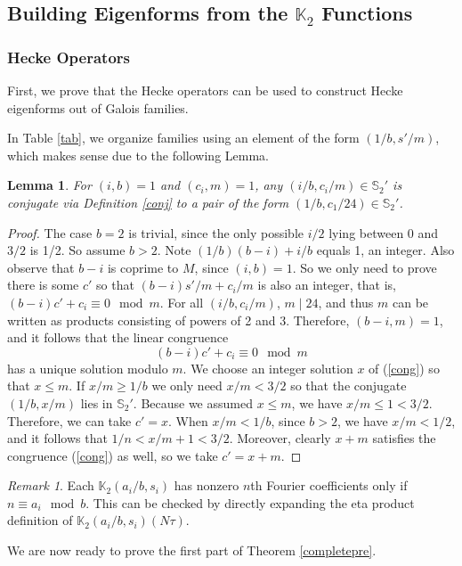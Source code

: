 \documentclass[12pt]{amsart}
\newtheorem{Lemma}[theorem]{Lemma}
\theoremstyle{definition}
\theoremstyle{remark}
\newtheorem{remark}{Remark}
\begin{document}
\subsection{Building Eigenforms from the $\mathbb{K}_2$ Functions}\label{building}
\subsubsection{Hecke Operators}
First, we prove that the Hecke operators can be used to construct Hecke eigenforms out of Galois families.  

In Table \ref{tab}, we organize families using an element of the form $(1/b,s'/m)$, which makes sense due to the following Lemma.
\begin{Lemma}\label{1/b}
   For $(i,b)=1$ and $(c_i,m)=1$, any $(i/b,c_i/m)\in \mathbb S_2'$ is conjugate via Definition \ref{conj} to a pair of the form $(1/b,c_1/24)\in \mathbb S_2'$.
\end{Lemma}
\begin{proof}
    The case $b=2$ is trivial, since the only possible $i/2$ lying between $0$ and $3/2$ is 1/2. So assume $b>2$. Note $(1/b)(b-i)+i/b$ equals 1, an integer. Also observe that $b-i$ is coprime to $M$, since $(i,b)=1$. So we only need to prove there is some $c'$ so that $(b-i)s'/m+c_i/m$ is also an integer, that is, $(b-i)c'+c_i\equiv 0\mod m$. For all $(i/b,c_i/m)$, $m\mid 24$, and thus $m$ can be written as products consisting of powers of 2 and 3. Therefore, $(b-i, m)=1$, and it follows that the linear congruence \begin{equation}\label{cong}
        (b-i)c'+c_i\equiv 0\mod m
    \end{equation} has a unique solution modulo $m$. We choose an integer solution $x$ of (\ref{cong}) so that $x\leq m$. If $x/m\geq 1/b$ we only need $x/m<3/2$ so that the conjugate $(1/b,x/m)$ lies in $\mathbb S_2'$. Because we assumed $x\leq m$, we have $x/m\leq 1<3/2$. Therefore, we can take $c'=x$. When $x/m<1/b$, since $b>2$, we have $x/m<1/2$, and it follows that $1/n<x/m+1<3/2$. Moreover, clearly $x+m$ satisfies the congruence (\ref{cong}) as well, so we take $c'=x+m$.
\end{proof}
\begin{remark}\label{four}
    Each $\mathbb{K}_2(a_i/b,s_i)$ has nonzero $n$th Fourier coefficients only if $n\equiv a_i\mod b$. This can be checked by directly expanding the eta product definition of $\mathbb{K}_2(a_i/b,s_i)(N\tau)$.
\end{remark} 
We are now ready to prove the first part of Theorem \ref{completepre}.
\end{document}
